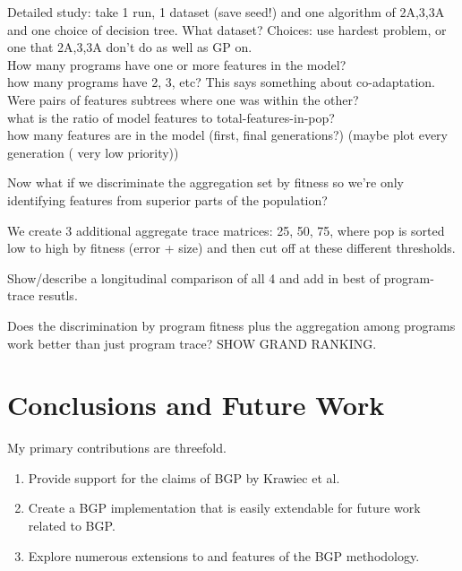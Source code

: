 Detailed study: take 1 run, 1 dataset (save seed!) and one algorithm of 2A,3,3A and one choice of decision tree.  What dataset? Choices: use hardest problem, or one that 2A,3,3A don't do as well as GP on. \\
How many programs have one or more features in the model?\\ how many programs have 2, 3, etc? This says something about co-adaptation. Were pairs of features subtrees where one was within the other?  \\what is the ratio of model features to total-features-in-pop? \\how many features are in the model (first, final generations?) (maybe plot every generation ( very low priority))

Now what if we discriminate the aggregation set by fitness so we're only identifying features from superior parts of the population?

We create 3 additional  aggregate trace matrices: 25, 50, 75,  where pop is sorted low to high by fitness (error + size) and then cut off at these different thresholds. 

Show/describe a longitudinal comparison of all 4 and add in best of program-trace resutls.

Does the discrimination by program fitness plus the aggregation among programs work better than just program trace? SHOW GRAND RANKING.





\section{Conclusions and Future Work}\label{sect:conc}
My primary contributions are threefold.

\begin{enumerate}[noitemsep]
\item Provide support for the claims of BGP by Krawiec et al.
\item Create a BGP implementation that is easily extendable for future work related to BGP.
\item Explore numerous extensions to and features of the BGP methodology.
\end{enumerate}

